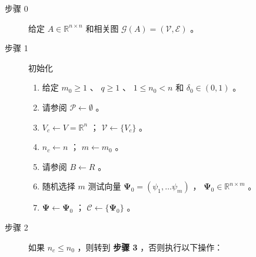 \documentclass[12pt]{acta_2011xz}
\begin{document}
   \begin{description}   \item    [步骤 0] 给定    $A\in \mathbb R^{n\times n}$    和相关图
   $\mathcal G(A)=(\mathcal V, \mathcal E)$    。
   \item    [步骤 1] 初始化
   \begin{enumerate}[1.]

   \item   给定          $m_0\ge 1$          、          $q\ge 1$          、          $1\le n_0< n$          和          $\delta_0\in (0, 1)$          。   \item   请参阅         $\mathcal P\leftarrow \emptyset$         。   \item            $V_c\leftarrow V=\mathbb{R}^n$         ；         $\mathcal V \leftarrow  \{ V_c  \} $         。   \item            $n_c\leftarrow n$         ；         $m\leftarrow m_0$         。   \item   请参阅         $B\leftarrow R$         。   \item   随机选择          $m$          测试向量 
         $\bm{\Psi}_0=(\psi_1, \ldots \psi_m)$          ，          $\bm{\Psi}_0\in \mathbb{R}^{n\times m}$          。   \item            $\bm{\Psi}\leftarrow \bm{\Psi}_0$         ；         $\mathcal C\leftarrow  \{ \bm{\Psi}_0 \} $         。  \end{enumerate}    

   \item    [步骤 2] 如果    $n_c\le n_0$    ，则转到  {    \bf    步骤 3   }  ，否则执行以下操作：
   \begin{enumerate}


\end{enumerate}
\end{description}
\end{document}
